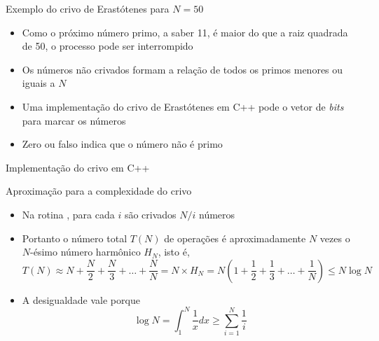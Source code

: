 

\begin{frame}[fragile]{Exemplo do crivo de Erastótenes para $N = 50$}

    \begin{itemize}
        \item Como o próximo número primo, a saber 11, é maior do que a raiz quadrada de 50, o 
            processo pode ser interrompido

        \item Os números não crivados formam a relação de todos os primos menores ou iguais a $N$

        \item Uma implementação do crivo de Erastótenes em C++ pode o vetor de \textit{bits} 
             para marcar os números

        \item Zero ou falso indica que o número não é primo
    \end{itemize}

\end{frame}

\begin{frame}[fragile]{Implementação do crivo em C++}
\end{frame}

\begin{frame}[fragile]{Aproximação para a complexidade do crivo}

    \begin{itemize}
        \item Na rotina , para cada $i$ são crivados $N/i$ números

        \item Portanto o número total $T(N)$ de operações é aproximadamente $N$ vezes o $N$-ésimo 
            número harmônico $H_N$, isto é,
$$
   T(N) \approx N + \frac{N}{2} + \frac{N}{3} + \ldots + \frac{N}{N} = N\times H_N =  N\left(1 + \frac{1}{2} + \frac{1}{3} + \ldots + \frac{1}{N}\right) \leq N \log N
$$

        \item A desigualdade vale porque 
$$
    \log N = \int_1^N \frac{1}{x} dx \geq \sum_{i = 1}^N  \frac{1}{i}
$$
    \end{itemize}

\end{frame}

